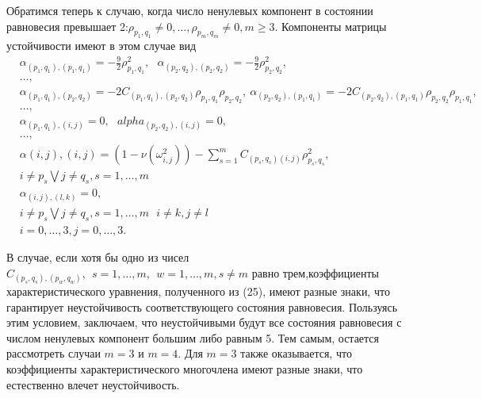 \documentclass[12pt]{article}  %
\begin{document}
Обратимся теперь к случаю,  когда число ненулевых компонент в состоянии равновесия превышает 2:$\rho_{p_1,q_1}\not=0,\dots,\rho_{p_m,q_m}\not=0, m\geq3$. Компоненты матрицы устойчивости имеют в этом случае вид
\begin{equation}
\begin{split}
&\alpha_{(p_1,q_1),(p_1,q_1)}=-\frac{9}{2}\rho^2_{p_1,q_1}, \ \ \ \alpha_{(p_2,q_2),(p_2,q_2)}=-\frac{9}{2}\rho^2_{p_2,q_2}, \\
&\dots,\\
&\alpha_{(p_1,q_1),(p_2,q_2)}=-2C_{(p_1,q_1),(p_2,q_2)}\rho_{p_1,q_1}\rho_{p_2,q_2}, \  \alpha_{(p_2,q_2),(p_1,q_1)}=-2C_{(p_2,q_2),(p_1,q_1)}\rho_{p_2,q_2}\rho_{p_1,q_1}, \\
&\dots,\\
&\alpha_{(p_1,q_1),(i,j)} = 0,\ \ \ alpha_{(p_2,q_2),(i,j)} = 0,\\
&\dots,\\
&\alpha{(i,j),(i,j)}=(1-\nu(\omega^2_{i,j}))-\sum_{s=1}^{m}C_{(p_s,q_s)(i,j)}\rho^2_{p_s,q_s},\\
&i\not=p_s \bigvee j\not=q_s, s=1,\dots,m\\
&\alpha_{(i,j),(l,k)} = 0, \\
&i\not=p_s \bigvee j\not=q_s, s=1,\dots,m \ \ \ i\not=k,j\not=l\\
&i=0,\dots,3,j=0,\dots,3.
\end{split}
\end{equation}

В случае, если хотя бы одно из чисел $C_{(p_s,q_s),(p_w,q_w)}, \ \ s=1,\dots,m, \ \ w=1,\dots,m, s\not=m$ равно трем,коэффициенты характеристического уравнения, полученного из (25), имеют разные знаки, что гарантирует неустойчивость соответствующего состояния равновесия. Пользуясь этим условием, заключаем, что неустойчивыми будут все состояния равновесия с числом ненулевых компонент большим либо равным 5. Тем самым, остается рассмотреть случаи $m=3$ и $m=4$. Для $m=3$ также оказывается, что коэффициенты характеристического многочлена имеют разные знаки, что естественно влечет неустойчивость.
\end{document}
